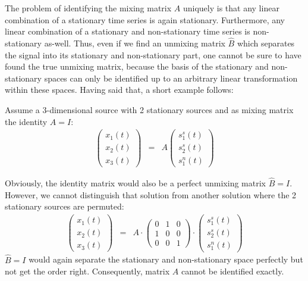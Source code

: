 \documentclass[a4paper, 12pt, titlepage]{article}
\begin{document}
The problem of identifying the mixing matrix $A$ uniquely is that any linear combination of a stationary time series is again stationary.
Furthermore, any linear combination of a stationary and non-stationary time series is non-stationary as-well.
Thus, even if we find an unmixing matrix $\hat B$ which separates the signal into its stationary and non-stationary part, one cannot be sure to have found the true unmixing matrix, because the basis of the stationary and non-stationary spaces can only be identified up to an arbitrary linear transformation within these spaces.
Having said that, a short example follows:

Assume a 3-dimensional source with 2 stationary sources and as mixing matrix the identity $A=I$:
\begin{eqnarray}
	\left(
		\begin{array}{c}
		x_1(t)\\
		x_2(t)\\
		x_3(t)		
		\end{array}
	\right) &=& A \left(
		\begin{array}{c}
			s^s_1(t)\\
			s^s_2(t)\\
			s^n_1(t)
		\end{array}
	\right)
\end{eqnarray}

Obviously, the identity matrix would also be a perfect unmixing matrix $\hat B = I$.
However, we cannot distinguish that solution from another solution where the 2 stationary sources are permuted:
\begin{eqnarray}
	\left(
		\begin{array}{c}
		x_1(t)\\
		x_2(t)\\
		x_3(t)		
		\end{array}
	\right) &=& A \cdot \left(
		\begin{array}{ccc}
		0&1&0\\
		1&0&0\\
		0&0&1
		\end{array}
	\right) \cdot \left(
		\begin{array}{c}
			s^s_1(t)\\
			s^s_2(t)\\
			s^n_1(t)
		\end{array}
	\right)
\end{eqnarray}
$\hat B=I$ would again separate the stationary and non-stationary space perfectly but not get the order right.
Consequently, matrix $A$ cannot be identified exactly.
\end{document}
